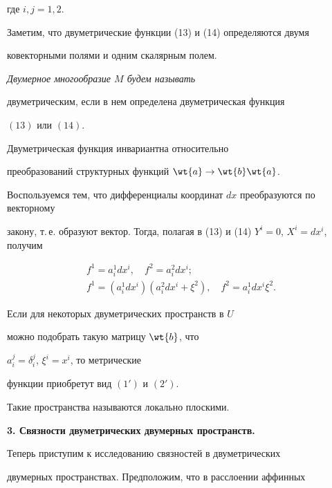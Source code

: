 где $i,j=1,2$.


Заметим, что двуметрические функции (13) и (14) определяются двумя


ковекторными полями и одним скалярным полем.





{\it Двумерное многообразие $M$ будем называть


двуметрическим, если в нем определена двуметрическая функция


$(13)$ или $(14)$.}


Двуметрическая функция инвариантна относительно


преобразований структурных функций $\wt{a} \to \wt{b}\wt{a}$.





Воспользуемся тем, что дифференциалы координат $dx$ преобразуются по векторному


закону, т.\,е. образуют вектор. Тогда, полагая в (13) и (14) $Y^i =


0$, $X^i=dx^i$, получим


\begin{gather}


f^1=a_i^1dx^i,\quad f^2=a_i^2dx^i; \tag{$13'$} \\


f^1=(a_i^1dx^i)(a_i^2dx^i+\xi^2),\quad


f^2=a_i^1dx^i\xi^2.\tag{$14'$}


\end{gather}


Если для некоторых двуметрических пространств в $U$


можно подобрать такую матрицу $\wt{b}$, что


$a_i^j=\delta_i^j$, $\xi^i=x^i$, то метрические


функции приобретут вид $(1')$ и $(2')$.


Такие пространства называются локально плоскими.


\medskip











{\bf 3. Связности двуметрических двумерных пространств.}


Теперь приступим к исследованию связностей в двуметрических 


двумерных пространствах. Предположим, что в расслоении аффинных 


